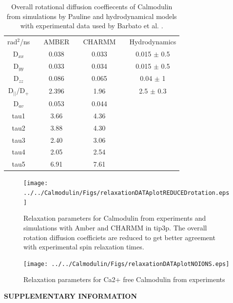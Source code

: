 \documentclass[pre,aps,floatfix,authordate1-4]{revtex4-1}
\begin{document}
\begin{table}[htb]
\centering
\caption{ Overall rotational diffusion coeffiecents of Calmodulin from
  simulations by Pauline and hydrodynamical models with experimental data
  used by Barbato et al. \cite{barbato92}.
}\label{ROTdiffCOEFFS}
\begin{tabular}{c c c c c c c}
rad$^2$/ns &   &  AMBER & &  CHARMM & &  Hydrodynamics \\
D$_{xx}$ &     &  0.038  & &  0.033  & & 0.015 $\pm$ 0.5\\
D$_{yy}$  &    &  0.033  & &  0.034  & & 0.015 $\pm$ 0.5\\
D$_{zz}$   &   &  0.086  & &  0.065  & & 0.04 $\pm$ 1\\
D$_||$/D$_+$ & & 2.396	& &  1.96   & & 2.5 $\pm$ 0.3\\
D$_{av}$    &  & 0.053   & &  0.044  & & \\
tau1     &    & 3.66    & &  4.36   & & \\
tau2     &    & 3.88    & &  4.30   & & \\
tau3     &    & 2.40    & &  3.06   & & \\
tau4      &   & 2.05	& &  2.54   & & \\
tau5      &   & 6.91	& &  7.61   & & \\
\end{tabular}
\end{table} 

\begin{figure}[!h]
  \texttt{[image: ../../Calmodulin/Figs/relaxationDATAplotREDUCEDrotation.eps]}%
  \caption{Relaxation parameters for Calmodulin from
    experiments and simulations with Amber and CHARMM in tip3p.
    The overall rotation diffusion coefficiets are reduced to
    get better agreement with experimental spin relaxation times.
    \label{hexPHASEdimensionsPLOT}}%
\end{figure}

\begin{figure}[!h]
  \texttt{[image: ../../Calmodulin/Figs/relaxationDATAplotNOIONS.eps]}%
  \caption{Relaxation parameters for Ca2+ free Calmodulin from
    experiments \cite{tjandra95} \label{hexPHASEdimensionsPLOT}}%
\end{figure}

\begin{acknowledgments}
\end{acknowledgments}



\newpage
\appendix
\begin{center}
{\bf SUPPLEMENTARY INFORMATION}
\end{center}


\end{document}
